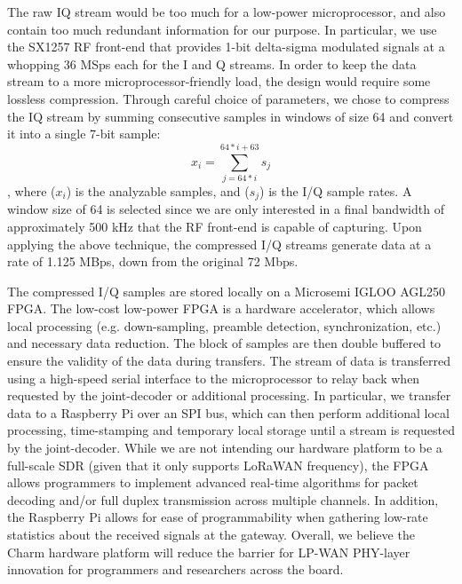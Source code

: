 
 The raw IQ stream would be too much for a low-power microprocessor, and  also contain too much redundant information for our purpose. In particular, we use the SX1257 RF front-end that provides 1-bit delta-sigma modulated signals at a whopping 36 MSps each for the I and Q streams.  In order to keep the data stream to a more microprocessor-friendly load, the design would require some lossless compression. Through careful choice of parameters, we chose to compress the IQ stream by summing consecutive samples in windows of size 64 and convert it into a single 7-bit sample: 
\begin{equation}
x_i = \sum_{j=64*i}^{64*i + 63} s_j
\end{equation}
, where ($x_i$) is the analyzable samples, and ($s_j$) is the I/Q sample rates. A window size of 64 is selected since we are only interested in a final
bandwidth of approximately 500 kHz that the RF front-end is capable of
capturing. Upon applying the above technique, the compressed I/Q streams generate data at a rate of 1.125 MBps, down from the original 72 Mbps. \vspace*{0.1in}


 The compressed I/Q samples are stored locally on a Microsemi IGLOO AGL250 FPGA. The low-cost low-power FPGA is a hardware accelerator, which allows local processing (e.g. down-sampling, preamble detection, synchronization, etc.) and necessary data reduction.  The block of samples are then double buffered to ensure the validity of the data during transfers. The stream of data is transferred using a high-speed serial interface to the microprocessor to relay back when requested by the joint-decoder or additional processing. In particular, we transfer data to a Raspberry Pi over an SPI bus, which can then perform additional local processing, time-stamping and temporary local storage until a stream is requested by the joint-decoder. While we are not intending our hardware platform to be a full-scale SDR (given that it only supports LoRaWAN frequency), the FPGA allows programmers to implement advanced real-time algorithms for packet decoding and/or full duplex transmission across multiple channels. In addition, the Raspberry Pi allows for ease of programmability when gathering low-rate statistics about the received signals at the gateway. Overall, we believe the Charm hardware platform will reduce the barrier for LP-WAN PHY-layer innovation for programmers and researchers across the board. 

